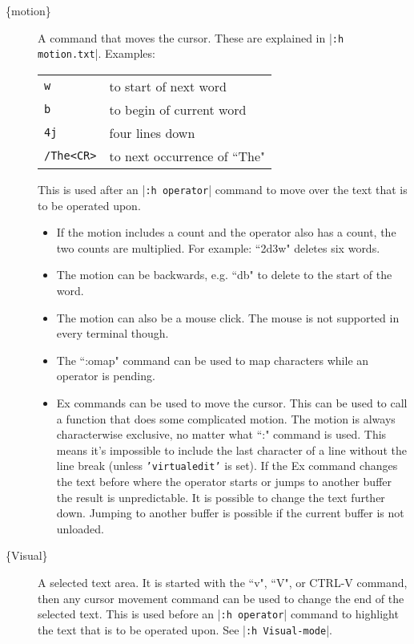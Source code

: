\begin{description}
				\item[\{motion\}]
								\label{{motion}}
								\label{movement}
								A command that moves the cursor.
								These are explained in |\texttt{:h motion.txt}|.
								Examples:
								\begin{center} \begin{tabular}{l l}
																\texttt{w} & to start of next word\\
																\texttt{b} & to begin of current word\\
																\texttt{4j} & four lines down\\
												\texttt{/The<CR>} & to next occurrence of ``The"\\
												\end{tabular}
								\end{center}
								This is used after an |\texttt{:h operator}| command to move over the text that is to be operated upon.
								\begin{itemize}
												\item If the motion includes a count and the operator also has a count, the two counts are multiplied.
																For example: ``2d3w" deletes six words.
												\item The motion can be backwards, e.g. ``db" to delete to the start of the word.
												\item The motion can also be a mouse click.
																The mouse is not supported in every terminal though.
												\item The ``:omap" command can be used to map characters while an operator is pending.
												\item Ex commands can be used to move the cursor.
																This can be used to call a function that does some complicated motion.
																The motion is always characterwise exclusive, no matter what ``:" command is used.
																This means it's impossible to include the last character of a line without the line break (unless \texttt{'virtualedit'} is set).
																If the Ex command changes the text before where the operator starts or jumps to another buffer the result is unpredictable.
																It is possible to change the text further down.
																Jumping to another buffer is possible if the current buffer is not unloaded.
								\end{itemize}

				\item[\{Visual\}]
								\label{{Visual}}
								A selected text area.
								It is started with the ``v", ``V", or CTRL-V command, then any cursor movement command can be used to change the end of the selected text.
								This is used before an |\texttt{:h operator}| command to highlight the text that is to be operated upon.
								See |\texttt{:h Visual-mode}|.


\end{description}
